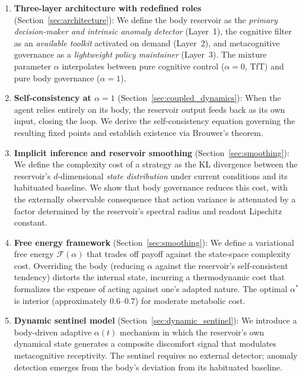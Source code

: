 \documentclass[11pt,a4paper]{article}
\theoremstyle{definition}
\newcommand{\FE}{\mathcal{F}}
\begin{document}
\begin{enumerate}[label=(\roman*)]
  \item \textbf{Three-layer architecture with redefined roles}
    (Section~\ref{sec:architecture}):
    We define the body reservoir as the \emph{primary decision-maker and intrinsic
    anomaly detector} (Layer~1), the cognitive filter as an \emph{available toolkit}
    activated on demand (Layer~2), and metacognitive governance as a
    \emph{lightweight policy maintainer} (Layer~3).  The mixture parameter
    $\alpha$ interpolates between pure cognitive control ($\alpha = 0$, TfT)
    and pure body governance ($\alpha = 1$).

  \item \textbf{Self-consistency at $\alpha = 1$}
    (Section~\ref{sec:coupled_dynamics}):
    When the agent relies entirely on its body, the reservoir output feeds back as
    its own input, closing the loop.  We derive the self-consistency equation
    governing the resulting fixed points and establish existence via Brouwer's
    theorem.

  \item \textbf{Implicit inference and reservoir smoothing}
    (Section~\ref{sec:smoothing}):
    We define the complexity cost of a strategy as the KL divergence between the
    reservoir's $d$-dimensional \emph{state distribution} under current conditions
    and its habituated baseline.  We show that body governance reduces
    this cost, with the externally observable consequence that action variance
    is attenuated by a factor determined by the reservoir's spectral radius and
    readout Lipschitz constant.

  \item \textbf{Free energy framework}
    (Section~\ref{sec:smoothing}):
    We define a variational free energy $\FE(\alpha)$ that trades off payoff against
    the state-space complexity cost.  Overriding the body (reducing $\alpha$ against
    the reservoir's self-consistent tendency) distorts the internal state, incurring
    a thermodynamic cost that formalizes the expense of acting against one's adapted
    nature.  The optimal $\alpha^{*}$ is interior (approximately $0.6$--$0.7$)
    for moderate metabolic cost.

  \item \textbf{Dynamic sentinel model}
    (Section~\ref{sec:dynamic_sentinel}):
    We introduce a body-driven adaptive $\alpha(t)$ mechanism in which the
    reservoir's own dynamical state generates a composite discomfort signal that
    modulates metacognitive receptivity.  The sentinel requires no external
    detector; anomaly detection emerges from the body's deviation from its
    habituated baseline.


\end{enumerate}
\end{document}
